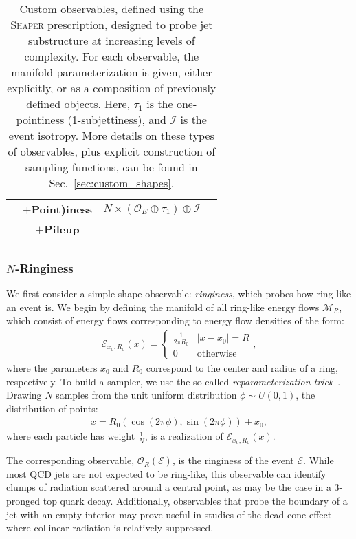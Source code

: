 \documentclass[letterpaper,11pt]{article}
\newcommand{\E}{\mathcal{E}}
\newcommand{\M}{\mathcal{M}}
\DeclareRobustCommand{\Sec}[1]{Sec.~\ref{sec:#1}}
\newcommand{\Shaper}{\textsc{Shaper}\xspace}
\begin{document}
\begin{table}[t]
\begin{tabular}{|c|c|c|c|}
 & {\bf $+$Point)iness}  & $N\times(\mathcal{O}_E \oplus \tau_1)\oplus\mathcal{I}$&  \\
&  {\bf $+$Pileup}&  & \\
& & & \\
\hline\hline
\end{tabular}
\caption{\label{tab:custom_shapes}
Custom observables, defined using the \Shaper prescription, designed to probe jet substructure at increasing levels of complexity. For each observable, the manifold parameterization is given, either explicitly, or as a composition of previously defined objects. Here, $\tau_1$ is the one-pointiness (1-subjettiness), and $\mathcal{I}$ is the event isotropy. More details on these types of observables, plus explicit construction of sampling functions, can be found in \Sec{custom_shapes}.
}
\end{table}
\afterpage{\clearpage}


\subsubsection{$N$-Ringiness}\label{sec:n_ringiness}

We first consider a simple shape observable: \emph{ringiness}, which probes how ring-like an event is. We begin by defining the manifold of all ring-like energy flows $\M_R$, which consist of energy flows corresponding to energy flow densities of the form:
%
\begin{align}
    \E_{x_0, R_0}(x) =\begin{cases} 
      \frac{1}{2\pi R_0} & |x-x_0| = R \\
      0 & \text{otherwise}   
      \end{cases},
\end{align}
%
where the parameters $x_0$ and $R_0$ correspond to the center and radius of a ring, respectively. To build a sampler, we use the so-called \emph{reparameterization trick}~\cite{https://doi.org/10.48550/arxiv.1506.02557}. Drawing $N$ samples from the unit uniform distribution $\phi \sim U(0,1)$, the distribution of points:
%
\begin{align}
    x = R_0\left(\cos(2\pi\phi), \sin(2\pi\phi)\right) + x_0, \label{eq:ring_sampler}
\end{align}
%
where each particle has weight $\frac{1}{N}$, is a realization of $\E_{x_0, R_0}(x)$. 

The corresponding observable, $\mathcal{O}_R(\E)$, is the ringiness of the event $\E$. While most QCD jets are not expected to be ring-like, this observable can identify clumps of radiation scattered around a central point, as may be the case in a 3-pronged top quark decay. Additionally, observables that probe the boundary of a jet with an empty interior may prove useful in studies of the dead-cone effect \cite{Dokshitzer:1991fc, Dokshitzer:1991fd, PhysRevLett.69.3025} where collinear radiation is relatively suppressed.
\end{document}
